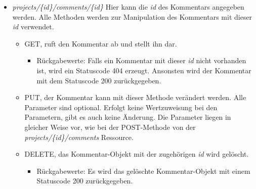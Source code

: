 \documentclass[12pt]{scrartcl}
\begin{document}
\begin{itemize}
\begin{itemize}
\begin{itemize}
					\end{itemize}
		\end{itemize}
			\item \emph{projects/\{id\}/comments/\{id\}} Hier kann die \emph{id} des Kommentars angegeben werden. Alle Methoden werden zur Manipulation des Kommentars mit dieser \emph{id} verwendet.
			\begin{itemize}
					\item GET, ruft den Kommentar ab und stellt ihn dar. 
					\begin{itemize}
						\item Rückgabewerte: Falls ein Kommentar mit dieser \emph{id} nicht vorhanden ist, wird ein Statuscode 404 erzeugt. Ansonsten wird der Kommentar mit dem Statuscode 200 zurückgegeben.
					\end{itemize}
					\item PUT, der Kommentar kann mit dieser Methode verändert werden. Alle Parameter sind optional. Erfolgt keine Wertzuweisung bei den Parametern, gibt es auch keine Änderung. Die Parameter liegen in gleicher Weise vor, wie bei der POST-Methode von der \emph{projects/\{id\}/comments} Ressource.
					\item DELETE, das Kommentar-Objekt mit der zugehörigen \emph{id} wird gelöscht.
					\begin{itemize}
						\item Rückgabewerte: Es wird das gelöschte Kommentar-Objekt mit einem Statuscode 200 zurückgegeben.
					\end{itemize}
			\end{itemize}
	\end{itemize}
\end{document}
